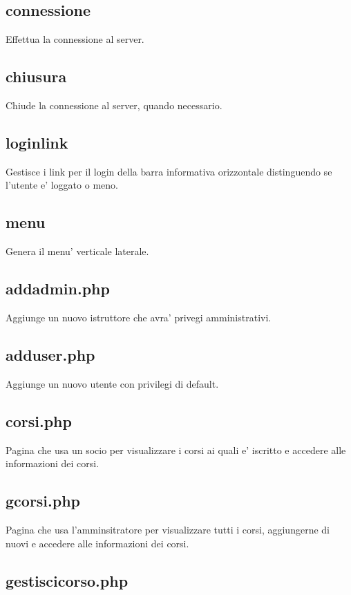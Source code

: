 \subsection{connessione}
Effettua la connessione al server.

\subsection{chiusura}
Chiude la connessione al server, quando necessario.

\subsection{loginlink}
Gestisce i link per il login della barra informativa orizzontale distinguendo se l'utente e' loggato o meno.

\subsection{menu}

Genera il menu' verticale laterale.

\subsection{addadmin.php}

Aggiunge un nuovo istruttore che avra' privegi amministrativi.

\subsection{adduser.php}

Aggiunge un nuovo utente con privilegi di default.

\subsection{corsi.php}

Pagina che usa un socio per visualizzare i corsi ai quali e' iscritto e accedere alle informazioni dei corsi.

\subsection{gcorsi.php}

Pagina che usa l'amminsitratore per visualizzare tutti i corsi, aggiungerne di nuovi e accedere alle informazioni dei corsi.

\subsection{gestiscicorso.php}

